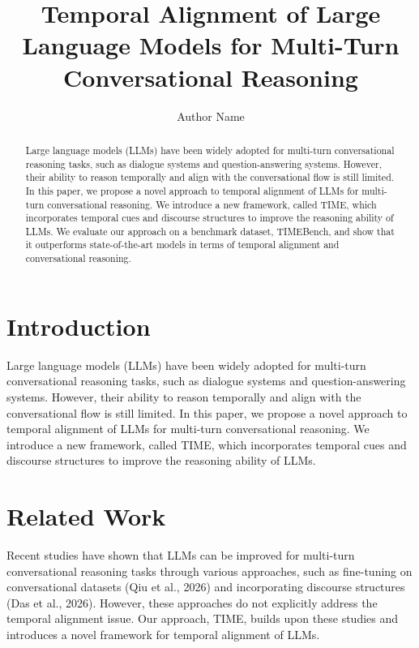 \documentclass{article}
\begin{document}
\title{Temporal Alignment of Large Language Models for Multi-Turn Conversational Reasoning}

\author{Author Name}

\maketitle

\begin{abstract}
Large language models (LLMs) have been widely adopted for multi-turn conversational reasoning tasks, such as dialogue systems and question-answering systems. However, their ability to reason temporally and align with the conversational flow is still limited. In this paper, we propose a novel approach to temporal alignment of LLMs for multi-turn conversational reasoning. We introduce a new framework, called TIME, which incorporates temporal cues and discourse structures to improve the reasoning ability of LLMs. We evaluate our approach on a benchmark dataset, TIMEBench, and show that it outperforms state-of-the-art models in terms of temporal alignment and conversational reasoning.

\end{abstract}

\section{Introduction}

Large language models (LLMs) have been widely adopted for multi-turn conversational reasoning tasks, such as dialogue systems and question-answering systems. However, their ability to reason temporally and align with the conversational flow is still limited. In this paper, we propose a novel approach to temporal alignment of LLMs for multi-turn conversational reasoning. We introduce a new framework, called TIME, which incorporates temporal cues and discourse structures to improve the reasoning ability of LLMs.

\section{Related Work}

Recent studies have shown that LLMs can be improved for multi-turn conversational reasoning tasks through various approaches, such as fine-tuning on conversational datasets (Qiu et al., 2026) and incorporating discourse structures (Das et al., 2026). However, these approaches do not explicitly address the temporal alignment issue. Our approach, TIME, builds upon these studies and introduces a novel framework for temporal alignment of LLMs.
\end{document}
